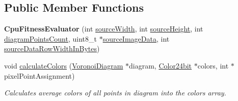 \subsection*{Public Member Functions}
\begin{DoxyCompactItemize}
\item 
{\bfseries Cpu\+Fitness\+Evaluator} (int \hyperlink{classlossycompressor_1_1_fitness_evaluator_ab24b1f451eece3d50d030145bdb806f7}{source\+Width}, int \hyperlink{classlossycompressor_1_1_fitness_evaluator_a22151a860849a3b8d0d9d3e2f3b46bdf}{source\+Height}, int \hyperlink{classlossycompressor_1_1_fitness_evaluator_aed694c851ddd4648513cd9c249654272}{diagram\+Points\+Count}, uint8\+\_\+t $\ast$\hyperlink{classlossycompressor_1_1_fitness_evaluator_af75273c5e267ab03a3f3f86c7b043a52}{source\+Image\+Data}, int \hyperlink{classlossycompressor_1_1_fitness_evaluator_a09bd546107e628d4e9e5ff57f078bccf}{source\+Data\+Row\+Width\+In\+Bytes})\hypertarget{classlossycompressor_1_1_cpu_fitness_evaluator_a03c20a21eb4d0680c636111dabb049cb}{}\label{classlossycompressor_1_1_cpu_fitness_evaluator_a03c20a21eb4d0680c636111dabb049cb}

\item 
void \hyperlink{classlossycompressor_1_1_cpu_fitness_evaluator_ad0a6252e1192d086e3734607dbb29b81}{calculate\+Colors} (\hyperlink{structlossycompressor_1_1_voronoi_diagram}{Voronoi\+Diagram} $\ast$diagram, \hyperlink{structlossycompressor_1_1_color24bit}{Color24bit} $\ast$colors, int $\ast$pixel\+Point\+Assignment)\hypertarget{classlossycompressor_1_1_cpu_fitness_evaluator_ad0a6252e1192d086e3734607dbb29b81}{}\label{classlossycompressor_1_1_cpu_fitness_evaluator_ad0a6252e1192d086e3734607dbb29b81}

\begin{DoxyCompactList}\small\item\em Calculates average colors of all points in diagram into the colors array. \end{DoxyCompactList}\end{DoxyCompactItemize}
